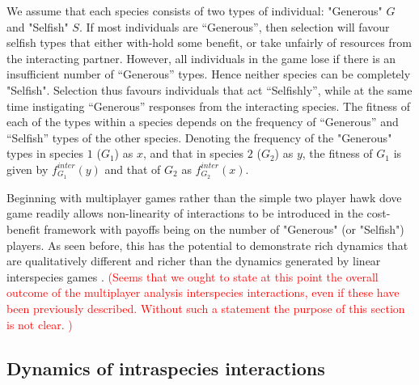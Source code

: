 \documentclass[12pt]{article}
\newcommand{\paul}[1]{\textcolor{red}{(#1)}}
\begin{document}
We assume that each species consists of two types of individual: "Generous" $G$ and "Selfish" $S$. If most individuals are “Generous”, then selection will favour selfish types that either with-hold some benefit, or take unfairly of resources from the interacting partner.  However, all individuals in the game lose if there is an insufficient number of “Generous” types.  Hence neither species can be completely "Selfish".  Selection thus favours individuals that act “Selfishly”, while at the same time instigating “Generous” responses from the interacting species. The fitness of each of the types within a species depends on the frequency of “Generous” and “Selfish” types of the other species. Denoting the frequency of the "Generous" types in species $1$ ($G_1$) as $x$, and that in species $2$ ($G_2$) as $y$, the fitness of $G_1$ is given by $f^{inter}_{G_1} (y)$ and that of $G_2$ as $f^{inter}_{G_2} (x)$.

Beginning with multiplayer games rather than the simple two player hawk dove game readily allows non-linearity of interactions to be introduced in the cost-benefit framework with payoffs being on the number of "Generous" (or "Selfish") players. As seen before, this has the potential to demonstrate rich dynamics that are qualitatively different and richer than the dynamics generated by linear interspecies games \citep{bergstrom:PNAS:2003,gokhale:PRSB:2012}.  \paul{Seems that we ought to state at this point the overall outcome of the multiplayer analysis interspecies interactions, even if these have been previously described.  Without such a statement the purpose of this section is not clear. }

\subsection{Dynamics of intraspecies interactions}
\end{document}

